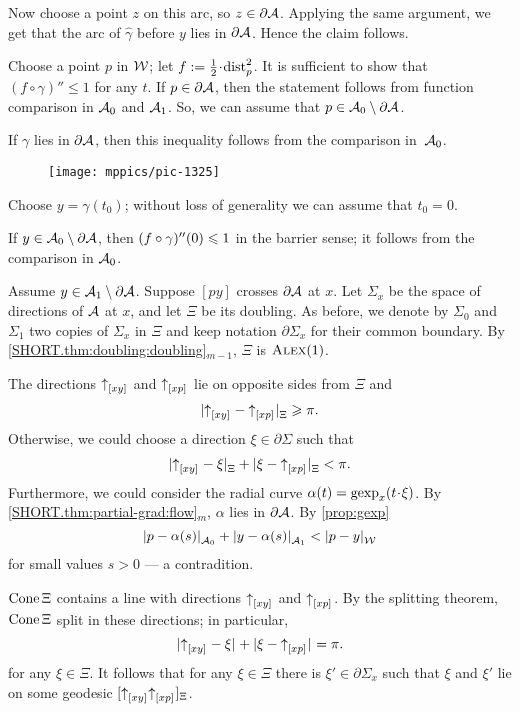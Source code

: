 Now choose a point $z$ on this arc, so $z\in \partial\mathcal{A}$.
Applying the same argument, we get that the arc of $\hat\gamma$ before $y$ lies in $\partial\mathcal{A}$.
Hence the claim follows.\claimqeds

Choose a point $p$ in $\mathcal{W}$;
let $f\df\tfrac12\cdot\distfun_p^2$.
It is sufficient to show that $(f\circ\gamma)''\le 1$ for any $t$.
If $p\in \partial\mathcal{A}$, then the statement follows from function comparison in $\mathcal{A}_0$ and $\mathcal{A}_1$.
So, we can assume that $p\in \mathcal{A}_0\setminus \partial\mathcal{A}$.

If $\gamma$ lies in $\partial \mathcal{A}$, then this inequality follows from the comparison in~$\mathcal{A}_0$.

\begin{wrapfigure}{r}{55mm}
\vskip-2mm
\centering
\texttt{[image: mppics/pic-1325]}
\end{wrapfigure}

Choose $y=\gamma(t_0)$; without loss of generality we can assume that $t_0=0$.

If $y\in \mathcal{A}_0\setminus\partial\mathcal{A}$, then $(f\circ\gamma)''(0)\leqslant 1$ in the barrier sense;
it follows from the comparison in $\mathcal{A}_0$.

Assume $y\in \mathcal{A}_1\setminus\partial\mathcal{A}$.
Suppose $[py]$ crosses $\partial\mathcal{A}$ at $x$.
Let $\Sigma_x$ be the space of directions of $\mathcal{A}$ at $x$,
and let $\Xi$ be its doubling.
As before, we denote by $\Sigma_0$ and $\Sigma_1$ two copies of $\Sigma_x$ in  $\Xi$
and keep notation $\partial\Sigma_x$ for their common boundary.
By \ref{SHORT.thm:doubling:doubling}$_{m-1}$, $\Xi$ is $\textsc{Alex}(1)$.

The directions ${\uparrow}_{[{x}{y}]_{{}}}$ and ${\uparrow}_{[{x}{p}]_{{}}}$ lie on opposite sides from $\Xi$ and
\[|{{\uparrow}_{[{x}{y}]_{{}}}}-{{\uparrow}_{[{x}{p}]_{{}}}}|_{\Xi}^{{}}\geqslant \pi.\]
Otherwise, we could choose a direction $\xi\in\partial\Sigma$ such that
\[|{{\uparrow}_{[{x}{y}]_{{}}}}-{\xi}|_{\Xi}^{{}}+|{\xi}-{{\uparrow}_{[{x}{p}]_{{}}}}|_{\Xi}^{{}}<\pi.\]
Furthermore, we could consider the radial curve $\alpha(t)=\gexp_x(t\cdot \xi)$.
By \ref{SHORT.thm:partial-grad:flow}$_m$, $\alpha$ lies in $\partial \mathcal{A}$.
By \ref{prop:gexp}
\[\dist{p}{\alpha(s)}{\spc{A}_0}
+\dist{y}{\alpha(s)}{\spc{A}_1}
<\dist{p}{y}{\spc{W}}\]
for small values $s>0$
--- a contradition.

$\mathop{\rm Cone}\nolimits \Xi$ contains a line with directions ${\uparrow}_{[{x}{y}]_{{}}}$ and ${\uparrow}_{[{x}{p}]_{{}}}$.
By the splitting theorem, $\mathop{\rm Cone}\nolimits \Xi$ split in these directions;
in particular, 
\[|{{\uparrow}_{[{x}{y}]_{{}}}}-{\xi}|_{}^{{}}+|{\xi}-{{\uparrow}_{[{x}{p}]_{{}}}}|_{}^{{}}=\pi.\]
for any $\xi\in\Xi$.
It follows that for any $\xi\in\Xi$ there is $\xi'\in\partial\Sigma_x$ such that 
$\xi$ and $\xi'$ lie on some geodesic $[{\uparrow}_{[{x}{y}]_{{}}} {\uparrow}_{[{x}{p}]_{{}}}]_\Xi$.

